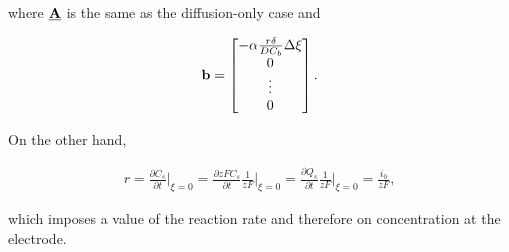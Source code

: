 where $\bf{\underline{A}}$ is the same as the diffusion-only case and 

\begin{align}
    \bf{b} = \begin{bmatrix}
                -\alpha\frac{r\delta}{DC_b} \Delta \xi\\
                0\\
                \vdots \\
                0
                \end{bmatrix}.
\end{align}

On the other hand,

\begin{align}
r = \frac{\partial C_s}{\partial t}\bigg|_{\xi = 0} = \frac{\partial zF C_s}{\partial t}\frac{1}{zF}\bigg|_{\xi = 0} = \frac{\partial Q_s}{\partial t}\frac{1}{zF}\bigg|_{\xi = 0} =  \frac{i_0}{zF},
\end{align}

which imposes a value of the reaction rate and therefore on concentration at the electrode.
\newpage
